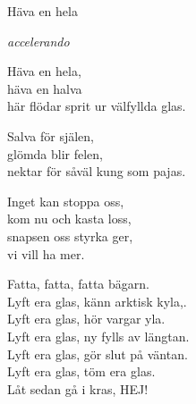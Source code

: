 \begin{song}{Häva en hela}
	
	
	
	\emph{accelerando}
	
	\begin{repetition}
		Häva en hela,\\
		häva en halva\\
		här flödar sprit ur välfyllda glas.

		Salva för själen,\\
		glömda blir felen,\\
		nektar för såväl kung som pajas.

		\begin{repetition}
			Inget kan stoppa oss,\\
			kom nu och kasta loss,\\
			snapsen oss styrka ger,\\
			vi vill ha mer.
		\end{repetition}

		Fatta, fatta, fatta bägarn.\\
		Lyft era glas, känn arktisk kyla,.\\
		Lyft era glas, hör vargar yla.\\
		Lyft era glas, ny fylls av längtan.\\
		Lyft era glas, gör slut på väntan.\\
		Lyft era glas, töm era glas.\\
		Låt sedan gå i kras, HEJ!
	\end{repetition}
	
\end{song}
